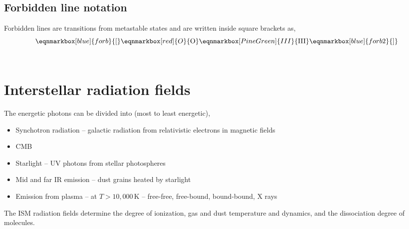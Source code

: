 \begin{center}
\end{center}

\subsection{Forbidden line notation}
Forbidden lines are transitions from metastable states and are written inside square brackets as,
\vspace{5mm}
\begin{equation}
  \eqnmarkbox[blue]{forb}{[}\eqnmarkbox[red]{O}{\text{O}}\eqnmarkbox[PineGreen]{III}{\text{III}}\eqnmarkbox[blue]{forb2}{]}
\end{equation}
\\

\section{Interstellar radiation fields}
The energetic photons can be divided into (most to least energetic),
\begin{itemize}
  \item \textsf{Synchotron radiation} -- galactic radiation from relativistic electrons in magnetic fields
  \item \textsf{CMB}
  \item \textsf{Starlight} -- UV photons from stellar photospheres
  \item \textsf{Mid and far IR emission} -- dust grains heated by starlight
  \item \textsf{Emission from plasma} -- at $T>10,000\,\text{K}$ -- free-free, free-bound, bound-bound, X rays
\end{itemize}

The ISM radiation fields determine the degree of ionization, gas and dust temperature and dynamics, and the dissociation degree of molecules.  
